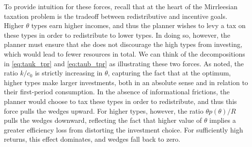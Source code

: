 \documentclass[11pt]{article}
\begin{document}
To provide intuition for these forces, recall that at the heart of the Mirrleesian taxation problem is the tradeoff between redistributive and incentive goals. Higher \( \theta \) types earn higher incomes, and thus the planner wishes to levy a tax on these types in order to redistribute to lower types. In doing so, however, the planner must ensure that she does not discourage the high types from investing, which would lead to fewer resources in total. We can think of the decompositions in \eqref{eq:tauk_tpr} and \eqref{eq:taub_tpr} as illustrating these two forces. As noted, the ratio \( k/c_0 \) is strictly increasing in \( \theta \), capturing the fact that at the optimum, higher types make larger investments, both in an absolute sense and in relation to their first-period consumption. In the absence of informational frictions, the planner would choose to tax these types in order to redistribute, and thus this force pulls the wedges upward. For higher types, however, the ratio \( \theta p(\theta) / R \) pulls the wedges downward, reflecting the fact that  higher value of \( \theta \) implies a greater efficiency loss from distorting the investment choice. For sufficiently high returns, this effect dominates, and wedges fall back to zero. 
\end{document}
